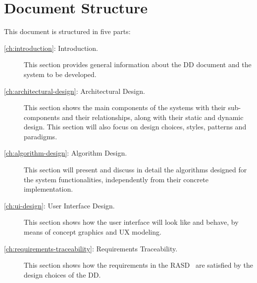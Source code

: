 \section{Document Structure}
\label{sec:structure}

This document is structured in five parts:
\begin{description}
\item[\autoref{ch:introduction}: Introduction.] This section provides general information about the DD document and the system to be developed.
\item[\autoref{ch:architectural-design}: Architectural Design.] This section shows the main components of the systems with their sub-components and their relationships, along with their static and dynamic design. This section will also focus on design choices, styles, patterns and paradigms.
\item[\autoref{ch:algorithm-design}: Algorithm Design.] This section will present and discuss in detail the algorithms designed for the system functionalities, independently from their concrete implementation.
\item[\autoref{ch:ui-design}: User Interface Design.] This section shows how the user interface will look like and behave, by means of concept graphics and UX modeling.
\item[\autoref{ch:requirements-traceability}: Requirements Traceability.] This section shows how the requirements in the RASD~\cite{rasd} are satisfied by the design choices of the DD.
\end{description}
